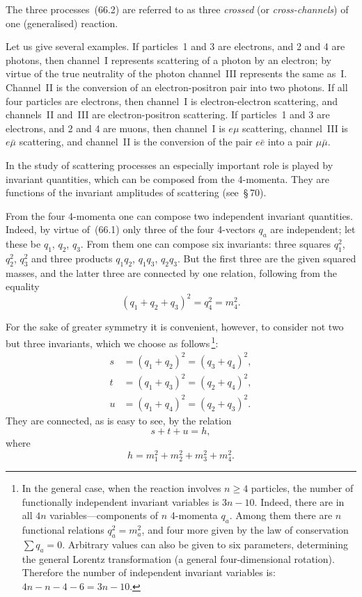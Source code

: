 The three processes~(66.2) are referred to as three \textit{crossed} (or \textit{cross-channels}) of one (generalised) reaction.

Let us give several examples. If particles~1 and 3 are electrons, and 2 and 4 are photons, then channel~I represents scattering of a photon by an electron; by virtue of the true neutrality of the photon channel~III represents the same as~I. Channel~II is the conversion of an electron-positron pair into two photons. If all four particles are electrons, then channel~I is electron-electron scattering, and channels~II and~III are electron-positron scattering. If particles~1 and 3 are electrons, and 2 and 4 are muons, then channel~I is $e\mu$ scattering, channel~III is $e\bar{\mu}$ scattering, and channel~II is the conversion of the pair $e\bar{e}$ into a pair $\mu\bar{\mu}$.

In the study of scattering processes an especially important role is played by invariant quantities, which can be composed from the 4-momenta. They are functions of the invariant amplitudes of scattering (see~\S\,70).

From the four 4-momenta one can compose two independent invariant quantities. Indeed, by virtue of~(66.1) only three of the four 4-vectors $q_a$ are independent; let these be $q_1$, $q_2$, $q_3$. From them one can compose six invariants: three squares $q^2_1$, $q^2_2$, $q^2_3$ and three products $q_1 q_2$, $q_1 q_3$, $q_2 q_3$. But the first three are the given squared masses, and the latter three are connected by one relation, following from the equality
\[
(q_1 + q_2 + q_3)^2 = q^2_4 = m^2_4.
\]

For the sake of greater symmetry it is convenient, however, to consider not two but three invariants, which we choose as follows\,\footnote{In the general case, when the reaction involves $n \geqslant 4$ particles, the number of functionally independent invariant variables is $3n - 10$. Indeed, there are in all $4n$ variables---components of $n$ 4-momenta $q_a$. Among them there are $n$ functional relations $q^2_a = m^2_a$, and four more given by the law of conservation $\sum q_a = 0$. Arbitrary values can also be given to six parameters, determining the general Lorentz transformation (a general four-dimensional rotation). Therefore the number of independent invariant variables is: $4n - n - 4 - 6 = 3n - 10$.}:
\begin{equation}
\begin{aligned}
s &= (q_1 + q_2)^2 = (q_3 + q_4)^2,\\[3pt]
t &= (q_1 + q_3)^2 = (q_2 + q_4)^2,\\[3pt]
u &= (q_1 + q_4)^2 = (q_2 + q_3)^2.
\end{aligned}
\tag{66.3}
\end{equation}
They are connected, as is easy to see, by the relation
\begin{equation}
s + t + u = h,
\tag{66.4}
\end{equation}
where
\begin{equation}
h = m^2_1 + m^2_2 + m^2_3 + m^2_4.
\tag{66.5}
\end{equation}

